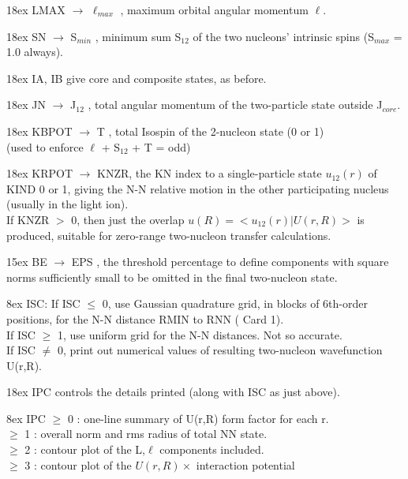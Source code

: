 \documentclass[11pt]{article}
\begin{document}
\hangindent 18ex
LMAX  $\rightarrow$ $\ell_{max}$  , maximum orbital angular momentum $\ell$.

\hangindent 18ex
SN    $\rightarrow$ S$_{min}$  , minimum sum S$_{12}$ of the two nucleons' intrinsic spins
                 (S$_{max}$ = 1.0 always).

\hangindent 18ex
IA, IB   give core and composite states, as before.

\hangindent 18ex
JN    $\rightarrow$ J$_{12}$   , total angular momentum of the two-particle state
outside J$_{core}$.

\hangindent 18ex
KBPOT $\rightarrow$ T     , total Isospin  of the 2-nucleon state (0 or 1)
\\
(used to enforce  $\ell$ + S$_{12}$ + T = odd)

\hangindent 18ex
KRPOT $\rightarrow$ KNZR, the KN index to a single-particle state $u_{12}(r)$
of KIND 0 or 1, giving the N-N relative motion in the
other participating nucleus (usually in the light ion).
\\
If KNZR $>$ 0, then just the overlap $ u(R)  =  <u_{12}(r) | U(r,R) > $ is
produced, suitable for zero-range two-nucleon transfer calculations.

\hangindent 15ex
BE    $\rightarrow$ EPS   , the threshold percentage to define components with
square norms sufficiently small to be omitted in the final two-nucleon
state.

\hangindent 8ex  ISC:
      If ISC $\le$ 0, use Gaussian quadrature grid, in blocks of 6th-order
      positions, for the N-N distance RMIN to RNN ( Card 1).
\\  If ISC $\geq$ 1, use uniform grid for the N-N distances.  Not so accurate.
\\  If ISC $\neq$ 0, print out numerical values of resulting two-nucleon wavefunction
U(r,R).



\hangindent 18ex
IPC controls the details printed (along with ISC as just above).

\hangindent 8ex  IPC
      $\geq$ 0 : one-line summary of U(r,R) form factor for each r.
\\  $\geq$ 1 : overall norm and rms radius of total NN state.
\\  $\geq$ 2 : contour plot of the L,$\ell$ components included.
\\  $\geq$ 3 : contour plot of the $U(r,R) \times$ interaction potential
\end{document}
